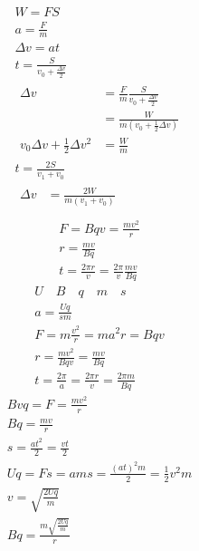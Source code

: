 \documentclass{article}
\newcommand\F[2]{\frac{#1}{#2}}
\begin{document}
  \begin{gather*}
    W = FS \\
    a = \frac{F}{m} \\
    \Delta v = at \\
    t = \frac{S}{v_{0} + \frac{\Delta v}{2}} \\
    \begin{aligned}
      \Delta v &= \frac{F}{m} \frac{S}{v_{0} + \frac{\Delta v}{2}} \\
      &= \frac{W}{m(v_{0} + \frac{1}{2}\Delta v)} \\
      v_{0}\Delta v + \frac{1}{2}\Delta v^{2} &= \frac{W}{m}
    \end{aligned} \\
    t = \frac{2S}{v_{1} + v_{0}} \\
    \begin{aligned}
      \Delta v &= \frac{2W}{m(v_{1} + v_{0})} \\
    \end{aligned}
  \end{gather*}
  \begin{gather*}
    F = Bqv = \frac{mv^2}{r} \\
    r = \frac{mv}{Bq} \\
    t = \frac{2\pi r}{v} = \frac{2\pi}{v} \frac{mv}{Bq}
  \end{gather*}
  \begin{gather*}
    U \quad B \quad q \quad m \quad s \\
    a = \F{Uq}{sm} \\
    F = m\F{v^2}{r} = ma^2r = Bqv \\
    r = \F{mv^2}{Bqv} = \F{mv}{Bq} \\
    t = \F{2\pi}{a} = \F{2\pi r}{v} = \F{2\pi m}{Bq}
  \end{gather*}
  \begin{gather*}
    Bvq = F = \F{mv^2}{r} \\
    Bq = \F{mv}{r} \\
    s = \F{at^2}{2} = \F{vt}{2} \\
    Uq = Fs = ams = \F{(at)^2m}{2} = \F{1}{2}v^2m \\
    v = \sqrt{\F{2Uq}{m}} \\
    Bq = \F{m\sqrt{\F{2Uq}{m}}}{r}
  \end{gather*}
\end{document}
